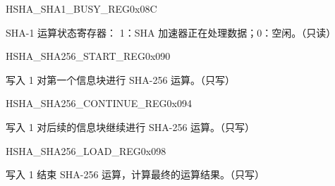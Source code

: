 \begin{register}{H}{SHA\_SHA1\_BUSY\_REG}{0x08C}\label{regdesc:SHASHA1BUSYREG}
%
%
\regnewline%
\begin{regdesc}\begin{reglist}
\item [SHA\_SHA1\_BUSY] SHA-1 运算状态寄存器： 1：SHA 加速器正在处理数据；0：空闲。（只读）
\end{reglist}\end{regdesc}
\end{register}


\begin{register}{H}{SHA\_SHA256\_START\_REG}{0x090}\label{regdesc:SHASHA256STARTREG}
%
%
\regnewline%
\begin{regdesc}\begin{reglist}
\item [SHA\_SHA256\_START] 写入 1 对第一个信息块进行 SHA-256 运算。（只写）
\end{reglist}\end{regdesc}
\end{register}


\begin{register}{H}{SHA\_SHA256\_CONTINUE\_REG}{0x094}\label{regdesc:SHASHA256CONTINUEREG}
%
%
\regnewline%
\begin{regdesc}\begin{reglist}
\item [SHA\_SHA256\_CONTINUE] 写入 1 对后续的信息块继续进行 SHA-256 运算。（只写）
\end{reglist}\end{regdesc}
\end{register}


\begin{register}{H}{SHA\_SHA256\_LOAD\_REG}{0x098}\label{regdesc:SHASHA256LOADREG}
%
%
\regnewline%
\begin{regdesc}\begin{reglist}
\item [SHA\_SHA256\_LOAD] 写入 1 结束 SHA-256 运算，计算最终的运算结果。（只写）
\end{reglist}\end{regdesc}
\end{register}


